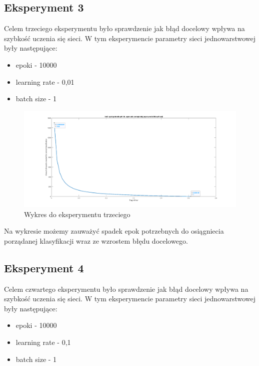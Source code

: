 \documentclass[12pt,twoside]{article}
\begin{document}
\subsection{Eksperyment 3}
Celem trzeciego eksperymentu było sprawdzenie jak błąd docelowy wpływa na szybkość uczenia się sieci.
W tym eksperymencie parametry sieci jednowarstwowej były następujące:
\begin{itemize}
	\item epoki - 10000
	\item learning rate - 0,01
	\item batch size - 1
\end{itemize}

\begin{figure}[ht!]
	\centering
	\includegraphics[width=15cm]{figures/target_epo_eta=0_01.png}
	\caption{Wykres do eksperymentu trzeciego}
\end{figure}
Na wykresie możemy zauważyć spadek epok potrzebnych do osiągniecia porządanej klasyfikacji wraz ze wzrostem błędu docelowego.
\newpage

\subsection{Eksperyment 4}
Celem czwartego eksperymentu było sprawdzenie jak błąd docelowy wpływa na szybkość uczenia się sieci.
W tym eksperymencie parametry sieci jednowarstwowej były następujące:
\begin{itemize}
	\item epoki - 10000
	\item learning rate - 0,1
	\item batch size - 1
\end{itemize}
\end{document}
